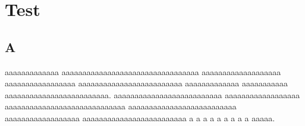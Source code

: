 \chapter{Test}
\section{A}
aaaaaaaaaaaaa aaaaaaaaaaaaaaaaaaaaaaaaaaaaaaaaa aaaaaaaaaaaaaaaaaaa aaaaaaaaaaaaaaaaa aaaaaaaaaaaaaaaaaaaaaaaaa aaaaaaaaaaaaa aaaaaaaaaaa aaaaaaaaaaaaaaaaaaaaaaaaa.
aaaaaaaaaaaaaaaaaaaaaaaaaa aaaaaaaaaaaaaaaaaa aaaaaaaaaaaaaaaaaaaaaaaaaaaaa aaaaaaaaaaaaaaaaaaaaaaaaaa aaaaaaaaaaaaaaaaaa aaaaaaaaaaaaaaaaaaaaaaaaa a a a a a a a a a aaaaa.
 

